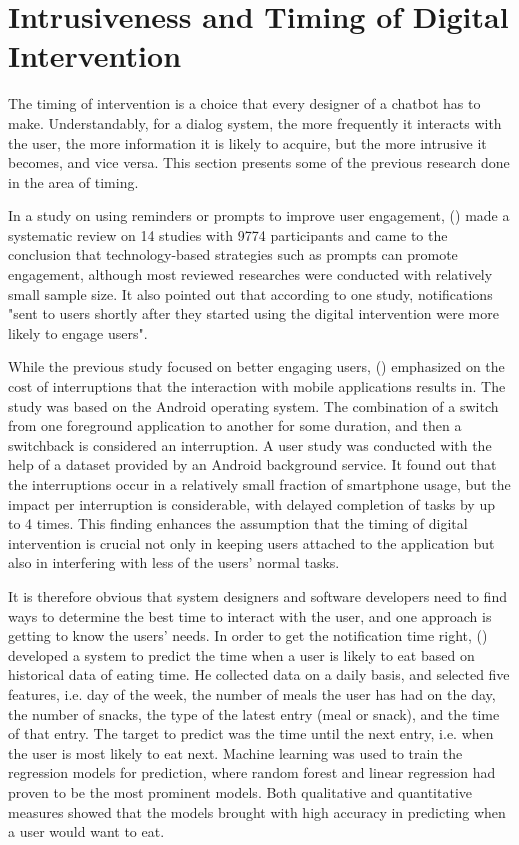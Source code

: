 \section{Intrusiveness and Timing of Digital Intervention}\label{section:timing}
The timing of intervention is a choice that every designer of a chatbot has to make. Understandably, for a dialog system, the more frequently it interacts with the user, the more information it is likely to acquire, but the more intrusive it becomes, and vice versa. This section presents some of the previous research done in the area of timing.\bigskip

\noindent In a study on using reminders or prompts to improve user engagement, \citeauthor{25_timing_review} (\citeyear{25_timing_review}) made a systematic review on 14 studies with 9774 participants and came to the conclusion that technology-based strategies such as prompts can promote engagement, although most reviewed researches were conducted with relatively small sample size. It also pointed out that according to one study, notifications "sent to users shortly after they started using the digital intervention were more likely to engage users".\bigskip

\noindent While the previous study focused on better engaging users, \citeauthor{26_cost_interruption} (\citeyear{26_cost_interruption}) emphasized on the cost of interruptions that the interaction with mobile applications results in. The study was based on the Android operating system. The combination of a switch from one foreground application to another for some duration, and then a switchback is considered an interruption. A user study was conducted with the help of a dataset provided by an Android background service. It found out that the interruptions occur in a relatively small fraction of smartphone usage, but the impact per interruption is considerable, with delayed completion of tasks by up to 4 times. This finding enhances the assumption that the timing of digital intervention is crucial not only in keeping users attached to the application but also in interfering with less of the users' normal tasks.\bigskip

\noindent It is therefore obvious that system designers and software developers need to find ways to determine the best time to interact with the user, and one approach is getting to know the users' needs. In order to get the notification time right, \citeauthor{27_oguz} (\citeyear{27_oguz}) developed a system to predict the time when a user is likely to eat based on historical data of eating time. He collected data on a daily basis, and selected five features, i.e. day of the week, the number of meals the user has had on the day, the number of snacks, the type of the latest entry (meal or snack), and the time of that entry. The target to predict was the time until the next entry, i.e. when the user is most likely to eat next. Machine learning was used to train the regression models for prediction, where random forest and linear regression had proven to be the most prominent models. Both qualitative and quantitative measures showed that the models brought with high accuracy in predicting when a user would want to eat.

